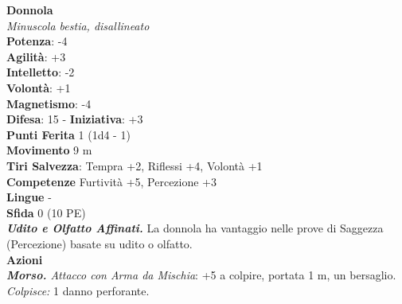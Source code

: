 \begin{multicols}{2}
\medskip\textbf{Donnola}\\
\emph{Minuscola bestia, disallineato}\\
\textbf{Potenza}: -4\\
\textbf{Agilità}: +3\\
\textbf{Intelletto}: -2\\
\textbf{Volontà}: +1\\
\textbf{Magnetismo}: -4\\
\textbf{Difesa}: 15 - \textbf{Iniziativa}: +3\\
\textbf{Punti Ferita} 1 (1d4 - 1)\\
\textbf{Movimento} 9 m\\
\textbf{Tiri Salvezza}: Tempra +2, Riflessi +4, Volontà +1\\
\textbf{Competenze} Furtività +5, Percezione +3\\
\textbf{Lingue} -\\
\textbf{Sfida} 0 (10 PE)\smallskip\\
\emph{\textbf{Udito e Olfatto Affinati.}} La donnola ha vantaggio nelle prove di Saggezza (Percezione) basate su udito o olfatto.\\
\smallskip\textbf{Azioni}\\
\emph{\textbf{Morso.} Attacco con Arma da Mischia}: +5 a colpire, portata 1 m, un bersaglio.\\
\emph{Colpisce:} 1 danno perforante.\\



\end{multicols}
